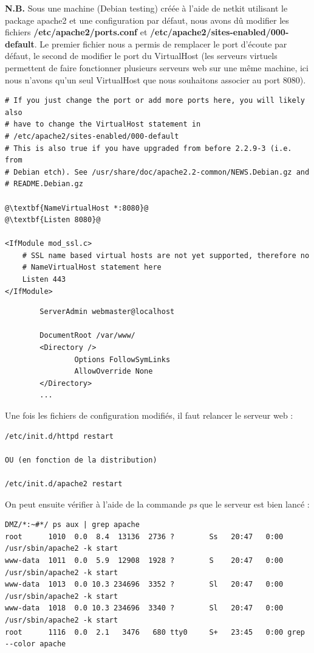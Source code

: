 \documentclass[frenchb, 11pt]{article}
\begin{document}
\noindent \textbf{N.B.} Sous une machine (Debian testing) créée à l'aide de netkit utilisant le package apache2 et une configuration par défaut, nous avons dû modifier les fichiers \textbf{/etc/apache2/ports.conf} et \textbf{/etc/apache2/sites-enabled/000-default}. Le premier fichier nous a permis de remplacer le port d'écoute par défaut, le second de modifier le port du VirtualHost (les serveurs virtuels permettent de faire fonctionner plusieurs serveurs web sur une même machine, ici nous n'avons qu'un seul VirtualHost que nous souhaitons associer au port 8080).

\begin{lstlisting}[caption=/etc/apache2/ports.conf, escapechar=@]
# If you just change the port or add more ports here, you will likely also
# have to change the VirtualHost statement in
# /etc/apache2/sites-enabled/000-default
# This is also true if you have upgraded from before 2.2.9-3 (i.e. from
# Debian etch). See /usr/share/doc/apache2.2-common/NEWS.Debian.gz and
# README.Debian.gz

@\textbf{NameVirtualHost *:8080}@
@\textbf{Listen 8080}@

<IfModule mod_ssl.c>
    # SSL name based virtual hosts are not yet supported, therefore no
    # NameVirtualHost statement here
    Listen 443
</IfModule>
\end{lstlisting}

\begin{lstlisting}[caption=/etc/apache2/sites-enabled/000-default, escapechar=\%]
%\textbf{<VirtualHost *:8080>}%
        ServerAdmin webmaster@localhost

        DocumentRoot /var/www/
        <Directory />
                Options FollowSymLinks
                AllowOverride None
        </Directory>
		...
\end{lstlisting}

\noindent Une fois les fichiers de configuration modifiés, il faut relancer le serveur web :
\begin{lstlisting}
/etc/init.d/httpd restart

OU (en fonction de la distribution)

/etc/init.d/apache2 restart
\end{lstlisting}
\hfill

\noindent On peut ensuite vérifier à l'aide de la commande \emph{ps} que le serveur est bien lancé :
\begin{lstlisting}
DMZ/*:~#*/ ps aux | grep apache
root      1010  0.0  8.4  13136  2736 ?        Ss   20:47   0:00 /usr/sbin/apache2 -k start
www-data  1011  0.0  5.9  12908  1928 ?        S    20:47   0:00 /usr/sbin/apache2 -k start
www-data  1013  0.0 10.3 234696  3352 ?        Sl   20:47   0:00 /usr/sbin/apache2 -k start
www-data  1018  0.0 10.3 234696  3340 ?        Sl   20:47   0:00 /usr/sbin/apache2 -k start
root      1116  0.0  2.1   3476   680 tty0     S+   23:45   0:00 grep --color apache
\end{lstlisting}
\hfill
\end{document}
